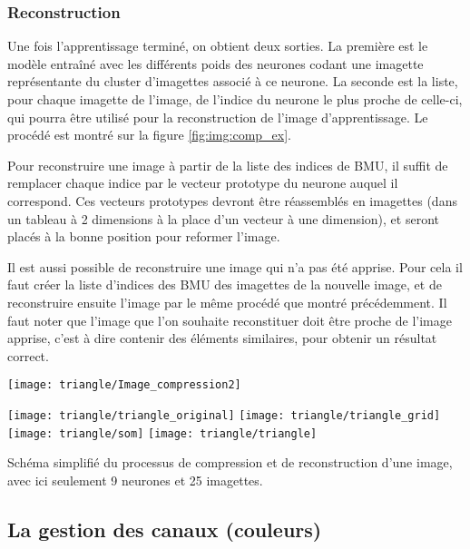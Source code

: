 	\subsubsection{Reconstruction}

	Une fois l'apprentissage terminé, on obtient deux sorties. La première est le modèle entraîné avec les différents poids des neurones codant une imagette représentante du cluster d'imagettes associé à ce neurone. La seconde est la liste, pour chaque imagette de l'image, de l'indice du neurone le plus proche de celle-ci, qui pourra être utilisé pour la reconstruction de l'image d'apprentissage. Le procédé est montré sur la figure \ref{fig:img:comp_ex}.

	Pour reconstruire une image à partir de la liste des indices de BMU, il suffit de remplacer chaque indice par le vecteur prototype du neurone auquel il correspond. Ces vecteurs prototypes devront être réassemblés en imagettes (dans un tableau à 2 dimensions à la place d'un vecteur à une dimension), et seront placés à la bonne position pour reformer l'image.

	Il est aussi possible de reconstruire une image qui n'a pas été apprise. Pour cela il faut créer la liste d'indices des BMU des imagettes de la nouvelle image, et de reconstruire ensuite l'image par le même procédé que montré précédemment. Il faut noter que l'image que l'on souhaite reconstituer doit être proche de l'image apprise, c'est à dire contenir des éléments similaires, pour obtenir un résultat correct.

	\begin{figureth}
		\begin{subfigureth}{\textwidth}
			\texttt{[image: triangle/Image\_compression2]}
		\end{subfigureth}
		\begin{subfigureth}{\textwidth}
			\texttt{[image: triangle/triangle\_original]}\hfill
			\texttt{[image: triangle/triangle\_grid]}\hfill
			\texttt{[image: triangle/som]}\hfill
			\texttt{[image: triangle/triangle]}
		\end{subfigureth}
		\caption[Compression et décompression d'image]{Schéma simplifié du processus de compression et de reconstruction d'une image, avec ici seulement 9 neurones et 25 imagettes.}\label{fig:img:comp_ex}
	\end{figureth}

	\subsection{La gestion des canaux (couleurs)}\label{sec:img:colors}

